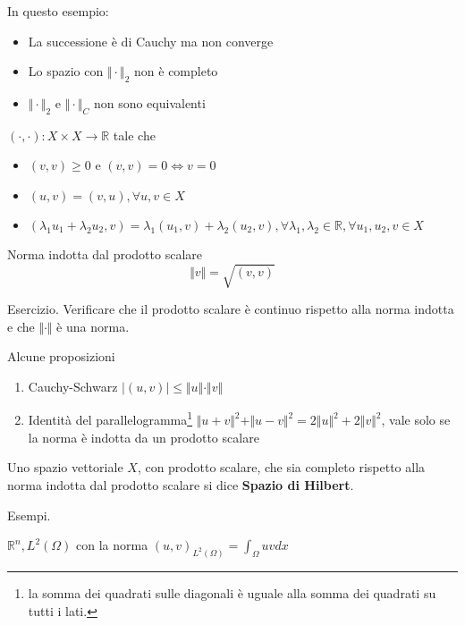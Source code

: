 \documentclass[10pt,a4paper,twoside,openright]{book}
\begin{document}
In questo esempio:
\begin{itemize}
\item La successione è di Cauchy ma non converge
\item Lo spazio con $\Vert \cdotp \Vert _{2}$ non è completo
\item $\Vert \cdotp \Vert _{2}$ e $\Vert \cdotp \Vert _{C}$ non sono equivalenti
\end{itemize}
\begin{definition}
 $(\cdotp,\cdotp) :X\times X\rightarrow \mathbb{R}$ tale che
\begin{itemize}
\item $(v,v) \geqslant 0$ e $(v,v) =0\Leftrightarrow v=0$
\item $(u,v) =(v,u),\forall u,v\in X$
\item $( \lambda _{1} u_{1} +\lambda _{2} u_{2},v) =\lambda _{1}(u_{1},v) +\lambda _{2}(u_{2},v),\forall \lambda _{1},\lambda _{2} \in \mathbb{R},\forall u_{1},u_{2},v\in X$
\end{itemize}
\end{definition}
\begin{definition}
Norma indotta dal prodotto scalare
\begin{equation*}
\Vert v\Vert =\sqrt{(v,v)}
\end{equation*}
\end{definition}
Esercizio. Verificare che il prodotto scalare è continuo rispetto alla norma indotta e che $\Vert \cdotp \Vert $ è una norma.
\begin{theorem}
Alcune proposizioni
\begin{enumerate}
\item Cauchy-Schwarz $| (u,v)| \leqslant \Vert u\Vert \cdotp \Vert v\Vert $
\item Identità del parallelogramma\footnote{la somma dei quadrati sulle diagonali è uguale alla somma dei quadrati su tutti i lati.} $\Vert u+v\Vert ^{2} +\Vert u-v\Vert ^{2} =2\Vert u\Vert ^{2} +2\Vert v\Vert ^{2}$, vale solo se la norma è indotta da un prodotto scalare
\end{enumerate}
\end{theorem}
\begin{definition}
Uno spazio vettoriale $X$, con prodotto scalare, che sia completo rispetto alla norma indotta dal prodotto scalare si dice \textbf{Spazio di Hilbert}.
\end{definition}
Esempi.

$\mathbb{R}^{n},L^{2}(\Omega)$ con la norma $(u,v)_{L^{2}(\Omega)} =\int _{\Omega } uvdx$
\end{document}
